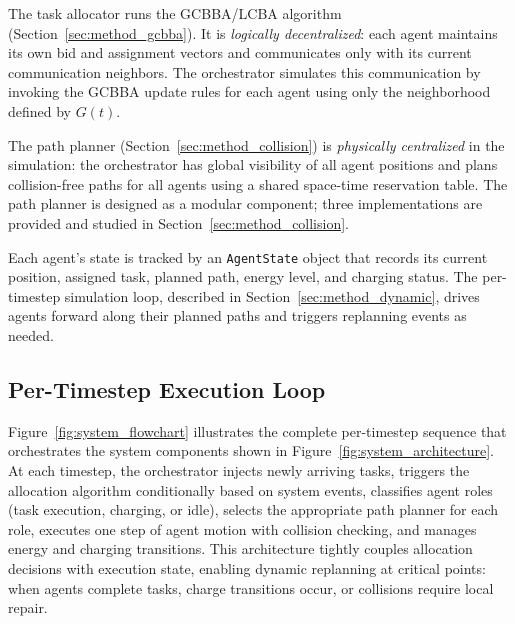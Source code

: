 The task allocator runs the GCBBA/LCBA algorithm (Section~\ref{sec:method_gcbba}).
It is \emph{logically decentralized}: each agent maintains its own bid and
assignment vectors and communicates only with its current communication
neighbors.
The orchestrator simulates this communication by invoking the GCBBA update
rules for each agent using only the neighborhood defined by $G(t)$.

The path planner (Section~\ref{sec:method_collision}) is \emph{physically
centralized} in the simulation: the orchestrator has global visibility of
all agent positions and plans collision-free paths for all agents using
a shared space-time reservation table.
The path planner is designed as a modular component; three implementations are
provided and studied in Section~\ref{sec:method_collision}.

Each agent's state is tracked by an \texttt{AgentState} object that records
its current position, assigned task, planned path, energy level, and charging
status.
The per-timestep simulation loop, described in
Section~\ref{sec:method_dynamic}, drives agents forward along their planned
paths and triggers replanning events as needed.

\subsection{Per-Timestep Execution Loop}
\label{sec:method_execution_loop}

Figure~\ref{fig:system_flowchart} illustrates the complete per-timestep
sequence that orchestrates the system components shown in Figure~\ref{fig:system_architecture}.
At each timestep, the orchestrator injects newly arriving tasks, triggers the
allocation algorithm conditionally based on system events, classifies agent roles
(task execution, charging, or idle), selects the appropriate path planner for
each role, executes one step of agent motion with collision checking, and
manages energy and charging transitions.
This architecture tightly couples allocation decisions with execution state,
enabling dynamic replanning at critical points: when agents complete tasks,
charge transitions occur, or collisions require local repair.


